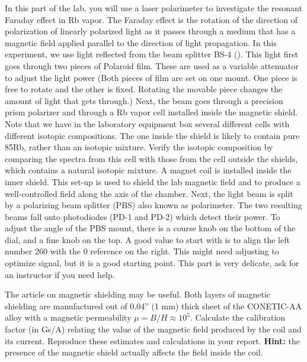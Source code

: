 \documentclass{../lab}
\begin{document}
In this part of the lab, you will use a laser polarimeter to investigate the resonant Faraday effect in Rb vapor. The Faraday effect is the rotation of the direction of polarization of linearly polarized light as it passes through a medium that has a magnetic field applied parallel to the direction of light propagation. In this experiment, we use light reflected from the beam splitter BS-4 (). This light first goes through two pieces of Polaroid film. These are used as a variable attenuator to adjust the light power (Both pieces of film are set on one mount. One piece is free to rotate and the other is fixed. Rotating the movable piece changes the amount of light that gets through.) Next, the beam goes through a precision prism polarizer and through a Rb vapor cell installed inside the magnetic shield. Note that we have in the laboratory equipment box several different cells with different isotopic compositions. The one inside the shield is likely to contain pure 85Rb, rather than an isotopic mixture. Verify the isotopic composition by comparing the spectra from this cell with those from the cell outside the shields, which contains a natural isotopic mixture. A magnet coil is installed inside the inner shield. This set-up is used to shield the lab magnetic field and to produce a well-controlled field along the axis of the chamber. Next, the light beam is split by a polarizing beam splitter (PBS) also known as polarimeter. The two resulting beams fall onto photodiodes (PD-1 and PD-2) which detect their power. To adjust the angle of the PBS mount, there is a course knob on the bottom of the dial, and a fine knob on the top. A good value to start with is to align the left number 260 with the 0 reference on the right. This might need adjusting to optimize signal, but it is a good starting point. This part is very delicate, ask for an instructor if you need help.



\newpage

The article on magnetic shielding may be useful. Both layers of magnetic shielding are manufactured out of 0.04'' (1 mm) thick sheet of the CONETIC-AA alloy with a magnetic permeability $\mu = B/H \approx 10^5$. Calculate the calibration factor (in Gs/A) relating the value of the magnetic field produced by the coil and its current. Reproduce these estimates and calculations in your report. \textbf{Hint:} the presence of the magnetic shield actually affects the field inside the coil.
\end{document}
